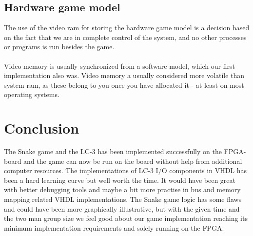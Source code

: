 \documentclass{acm_proc_article-sp}
\begin{document}
\subsection{Hardware game model}
The use of the video ram for storing the hardware game model is a decision based on the fact that we are in complete control of the system, and no other processes or programs is run besides the game.\\\\
Video memory is usually synchronized from a software model, which our first implementation also was. Video memory a usually considered more volatile than system ram, as these belong to you once you have allocated it - at least on most operating systems.

\section{Conclusion}
The Snake game and the LC-3 has been implemented successfully on the FPGA-board and the game can now be run on the board without help from additional computer resources. 
The implementations of LC-3 I/O components in VHDL has been a hard learning curve but well worth the time.
It would have been great with better debugging tools and maybe a bit more practise in bus and memory mapping related VHDL implementations.
The Snake game logic has some flaws and could have been more graphically illustrative, but with the given time and the two man group size we feel good about our game implementation reaching its minimum implementation requirements and solely running on the FPGA. 




\appendix


%
%
\end{document}
